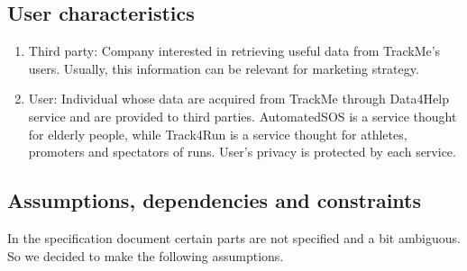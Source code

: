\subsection{User characteristics}
\begin{enumerate}
\item Third party: Company interested in retrieving useful data from TrackMe's users. Usually, this information can be relevant for marketing strategy.

\item User: Individual whose data are acquired from TrackMe through Data4Help service and are provided to third parties. AutomatedSOS is a service thought for elderly people, while Track4Run is a service thought for athletes, promoters and spectators of runs. User's privacy is protected by each service.

\end{enumerate}

\subsection{Assumptions, dependencies and constraints}
In the specification document certain parts are not specified and a bit ambiguous. So we decided to make the following assumptions.

